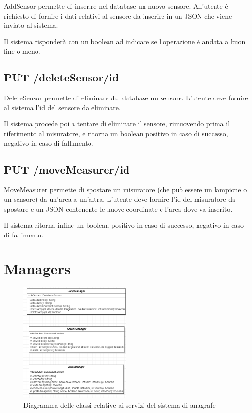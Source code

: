AddSensor permette di inserire nel database un nuovo sensore. All'utente è richiesto di fornire i dati relativi al sensore da inserire in un JSON che viene inviato al sistema.

Il sistema risponderà con un boolean ad indicare se l'operazione è andata a buon fine o meno.

\subsection{ PUT /deleteSensor/id}

DeleteSensor permette di eliminare dal database un sensore. L'utente deve fornire al sistema l'id del sensore da eliminare.

Il sistema procede poi a tentare di eliminare il sensore, rimuovendo prima il riferimento al misuratore, e ritorna un boolean positivo in caso di successo, negativo in caso di fallimento.

\subsection { PUT /moveMeasurer/id}

MoveMeasurer permette di spostare un misuratore (che può essere un lampione o un sensore) da un'area a un'altra. L'utente deve fornire l'id del misuratore da spostare e un JSON contenente le nuove coordinate e l'area dove va inserito.

Il sistema ritorna infine un boolean positivo in caso di successo, negativo in caso di fallimento.

\section{Managers}

\begin{figure}[h]
    \centering
    \includegraphics[width=0.5\textwidth]{img/manager_anagrafe.png}
    \caption{Diagramma delle classi relative ai servizi del sistema di anagrafe}
    \label{fig:manager_anagrafe}
\end{figure}

